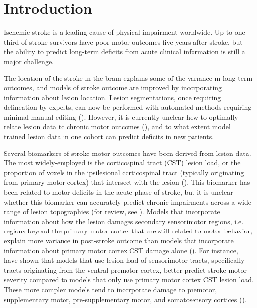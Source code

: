 \documentclass[10pt]{article}
\begin{document}
\section{Introduction}
Ischemic stroke is a leading cause of physical impairment worldwide. Up to one-third of stroke survivors have poor motor outcomes five years after stroke, but the ability to predict long-term deficits from acute clinical information is still a major challenge.

The location of the stroke in the brain explains some of the variance in long-term outcomes, and models of stroke outcome are improved by incorporating information about lesion location. Lesion segmentations, once requiring  delineation by experts, can now be performed with automated methods requiring minimal manual editing (\cite{Pustina2016-qu}). However, it is currently unclear how to optimally relate lesion data to chronic motor outcomes (\cite{Sperber2020-kp, Kasties2021-rm}), and to what extent model trained lesion data in one cohort can predict deficits in new patients.

Several biomarkers of stroke motor outcomes have been derived from lesion data. The most widely-employed is the corticospinal tract (CST) lesion load, or the proportion of voxels in the ipsilesional corticospinal tract (typically originating from primary motor cortex) that intersect with the lesion (\cite{Zhu2010-qh, Feng2015-du, Findlater2019-je}). This biomarker has been related to motor deficits in the acute phase of stroke, but it is unclear whether this biomarker can accurately predict chronic impairments across a wide range of lesion topographies (for review, see \cite{Kim2017-xe}). Models that incorporate information about how the lesion damages secondary sensorimotor regions, i.e. regions beyond the primary motor cortex that are still related to motor behavior, explain more variance in post-stroke outcome than models that incorporate information about primary motor cortex CST damage alone (\cite{Ito2022-em, Sperber2021-lw, Rondina2016-ds, Rondina2017-ij, Schulz2012-yy}). For instance, \cite{Ito2022-em} have shown that models that use lesion load of sensorimotor tracts, specifically tracts originating from the ventral premotor cortex, better predict stroke motor severity compared to models that only use primary motor cortex CST lesion load. These more complex models tend to incorporate damage to premotor, supplementary motor, pre-supplementary motor, and somatosensory cortices (\cite{Ito2022-em,Schulz2012-yy, Sperber2021-lw, Rondina2016-ds, Rondina2017-ij}).
\end{document}
